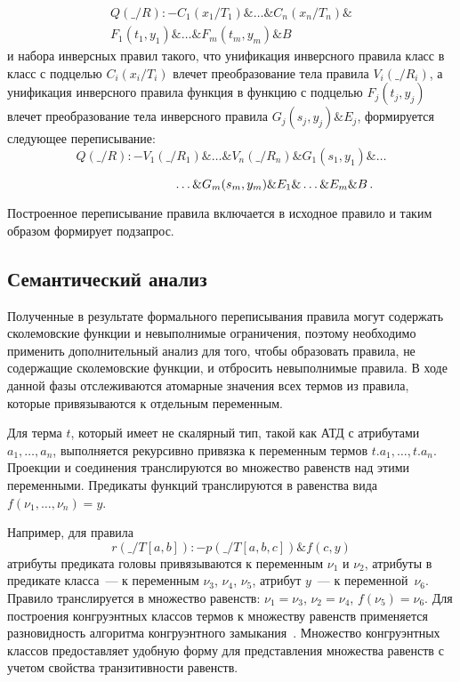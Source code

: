 \begin{multicols}{2}
\noindent
\begin{multline*}
Q(\_/R) :- C_1(x_1/T_1)\& \ldots  \& C_n(x_n/T_n)\&
\\
F_1(t_1, y_1) \& \ldots \& F_m(t_m, y_m) \& B
\end{multline*}
и набора инверсных правил такого, что унификация инверсного правила класс в
класс с под\-целью $C_i(x_i/T_i)$ влечет преобразование тела прави\-ла $V_i(\_/R_i)$, а
унификация инверсного %
 правила функция в функцию с подцелью $F_j(t_j, y_j)$ влечет
преобразование тела инверсного правила $G_j(s_j, y_j) \& E_j$, формируется следующее
переписывание:
$$%
Q(\_/R) :- V_1(\_/R_1) \& \ldots \& V_n(\_/R_n) \& G_1(s_1, y_1)\& \ldots
$$%
\vspace*{-18pt}

\noindent
$$\hspace*{70pt}\ldots
\& G_m(s_m, y_m) \& E_1 \& \ldots \& E_m \& B\,.
$$%

     Построенное переписывание правила включается в исходное правило и таким
образом формирует подзапрос.


\subsection{Семантический анализ}

     Полученные в результате формального переписывания правила могут содержать
сколемовские функции и невыполнимые ограничения, поэтому необходимо применить
дополнительный анализ для того, чтобы образовать правила, не содержащие сколемовские
функции, и отбросить невыполнимые правила. В ходе данной фазы отслеживаются
атомарные значения всех термов из правила, которые привязываются к отдельным
переменным.

     Для терма $t$, который имеет не скалярный тип, такой как АТД с атрибутами $a_1,
\ldots , a_n$, выполняется рекурсивно привязка к переменным термов $t.a_1, \ldots , t.a_n$.
Проекции и соединения транслируются во множество равенств над этими переменными.
Предикаты функций транслируются в равенства вида $f(\nu_1, \ldots , \nu_n)=y$.

     Например, для правила
     $$
r(\_/T[a, b]) :- p(\_/T[a, b, c]) \& f(c, y)
$$
атрибуты предиката головы привязываются к переменным $\nu_1$ и $\nu_2$,
атрибуты в
предикате класса~--- к переменным $\nu_3$, $\nu_4$, $\nu_5$,
атрибут $y$~--- к переменной~$\nu_6$. Правило транслируется в множество равенств: $\nu_1=\nu_3$,
$\nu_2=\nu_4$, $f(\nu_5)=\nu_6$. Для построения конгруэнтных классов термов к множеству
равенств применяется разновидность алгоритма конгруэнтного замыкания~\cite{Nie03}.
Множество конгруэнтных классов предоставляет удобную форму для представления
множества равенств с учетом свойства транзитивности равенств.


\end{multicols}
